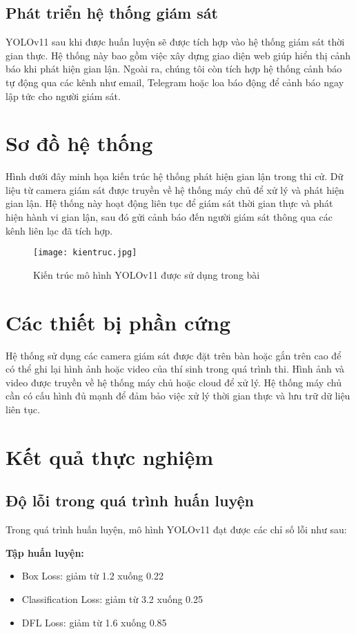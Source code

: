 \documentclass[conference]{IEEEtran}
\begin{document}
\subsection{Phát triển hệ thống giám sát}
YOLOv11 sau khi được huấn luyện sẽ được tích hợp vào hệ thống giám sát thời gian thực. Hệ thống này bao gồm việc xây dựng giao diện web giúp hiển thị cảnh báo khi phát hiện gian lận. Ngoài ra, chúng tôi còn tích hợp hệ thống cảnh báo tự động qua các kênh như email, Telegram hoặc loa báo động để cảnh báo ngay lập tức cho người giám sát.

\section{Sơ đồ hệ thống}
Hình dưới đây minh họa kiến trúc hệ thống phát hiện gian lận trong thi cử. Dữ liệu từ camera giám sát được truyền về hệ thống máy chủ để xử lý và phát hiện gian lận. Hệ thống này hoạt động liên tục để giám sát thời gian thực và phát hiện hành vi gian lận, sau đó gửi cảnh báo đến người giám sát thông qua các kênh liên lạc đã tích hợp.

\begin{figure}[h]
    \centering
    \texttt{[image: kientruc.jpg]}
    \caption{Kiến trúc mô hình YOLOv11 được sử dụng trong bài}
    \label{fig:yolov11_architecture}
\end{figure}
\section{Các thiết bị phần cứng}
Hệ thống sử dụng các camera giám sát được đặt trên bàn hoặc gắn trên cao để có thể ghi lại hình ảnh hoặc video của thí sinh trong quá trình thi. Hình ảnh và video được truyền về hệ thống máy chủ hoặc cloud để xử lý. Hệ thống máy chủ cần có cấu hình đủ mạnh để đảm bảo việc xử lý thời gian thực và lưu trữ dữ liệu liên tục.

\section{Kết quả thực nghiệm}

\subsection{Độ lỗi trong quá trình huấn luyện}
Trong quá trình huấn luyện, mô hình YOLOv11 đạt được các chỉ số lỗi như sau:

\textbf{Tập huấn luyện:}
\begin{itemize}
    \item Box Loss: giảm từ 1.2 xuống 0.22
    \item Classification Loss: giảm từ 3.2 xuống 0.25
    \item DFL Loss: giảm từ 1.6 xuống 0.85
\end{itemize}
\end{document}
